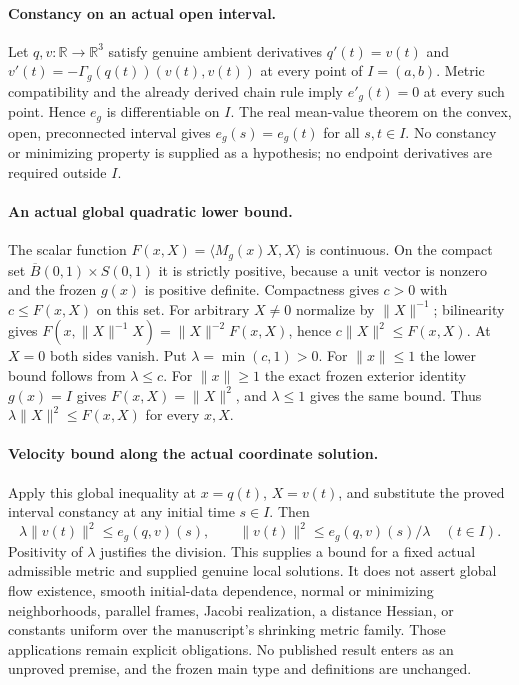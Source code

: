 \documentclass[11pt]{article}
\theoremstyle{definition}
\theoremstyle{remark}
\numberwithin{equation}{section}
\begin{document}
\paragraph{Constancy on an actual open interval.}
Let $q,v:\mathbb R\to\mathbb R^3$ satisfy genuine ambient derivatives
$q'(t)=v(t)$ and $v'(t)=-\Gamma_g(q(t))(v(t),v(t))$ at every point of
$I=(a,b)$. Metric compatibility and the already derived chain rule imply
$e'_g(t)=0$ at every such point. Hence $e_g$ is differentiable on $I$.
The real mean-value theorem on the convex, open, preconnected interval gives
$e_g(s)=e_g(t)$ for all $s,t\in I$. No constancy or minimizing property is
supplied as a hypothesis; no endpoint derivatives are required outside $I$.

\paragraph{An actual global quadratic lower bound.}
The scalar function $F(x,X)=\langle M_g(x)X,X\rangle$ is continuous.
On the compact set $\overline B(0,1)\times S(0,1)$ it is strictly positive,
because a unit vector is nonzero and the frozen $g(x)$ is positive definite.
Compactness gives $c>0$ with $c\le F(x,X)$ on this set. For arbitrary $X\ne0$
normalize by $\|X\|^{-1}$; bilinearity gives
$F(x,\|X\|^{-1}X)=\|X\|^{-2}F(x,X)$, hence
$c\|X\|^2\le F(x,X)$. At $X=0$ both sides vanish. Put
$\lambda=\min(c,1)>0$. For $\|x\|\le1$ the lower bound follows from
$\lambda\le c$. For $\|x\|\ge1$ the exact frozen exterior identity
$g(x)=I$ gives $F(x,X)=\|X\|^2$, and $\lambda\le1$ gives the same
bound. Thus $\lambda\|X\|^2\le F(x,X)$ for every $x,X$.

\paragraph{Velocity bound along the actual coordinate solution.}
Apply this global inequality at $x=q(t)$, $X=v(t)$, and substitute the
proved interval constancy at any initial time $s\in I$. Then
\[
 \lambda\|v(t)\|^2\le e_g(q,v)(s),\qquad
 \|v(t)\|^2\le e_g(q,v)(s)/\lambda\quad(t\in I).
\]
Positivity of $\lambda$ justifies the division. This supplies a bound for a
fixed actual admissible metric and supplied genuine local solutions. It does
not assert global flow existence, smooth initial-data dependence, normal or
minimizing neighborhoods, parallel frames, Jacobi realization, a distance
Hessian, or constants uniform over the manuscript's shrinking metric family.
Those applications remain explicit obligations. No published result enters as
an unproved premise, and the frozen main type and definitions are unchanged.
\end{document}
